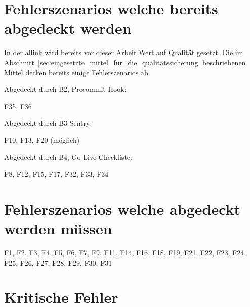 
\section{Fehlerszenarios welche bereits abgedeckt werden}
\label{sec:fehlerszenarios_welche_bereits_abgedeckt_werden}
In der allink wird bereits vor dieser Arbeit Wert auf Qualität gesetzt. Die im Abschnitt~\ref{sec:eingesetzte_mittel_für_die_qualitätssicherung} beschriebenen Mittel decken bereits einige Fehlerszenarios ab.


Abgedeckt durch B2, Precommit Hook:

F35, F36

Abgedeckt durch B3 Sentry:

F10, F13, F20 (möglich)

Abgedeckt durch B4, Go-Live Checkliste:

F8, F12, F15, F17, F32, F33, F34

\section{Fehlerszenarios welche abgedeckt werden müssen}
\label{sec:fehlerszenarios_welche_abgedeckt_werden_müssen}

F1, F2, F3, F4, F5, F6, F7, F9, F11, F14, F16, F18, F19, F21, F22, F23, F24, F25, F26, F27, F28, F29, F30, F31


\section{Kritische Fehler}
\label{sec:kritische_fehler}

